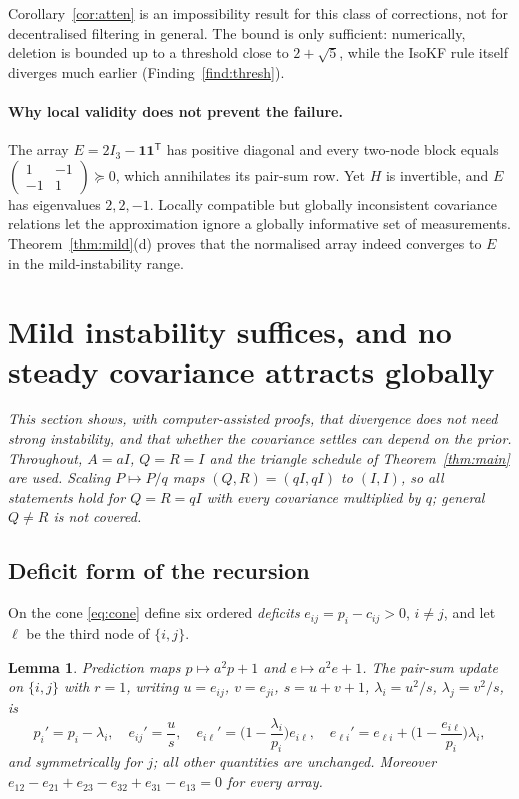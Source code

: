 \documentclass[11pt,a4paper]{article}
\numberwithin{equation}{section}
\newtheorem{lemma}[theorem]{Lemma}
\theoremstyle{remark}\newtheorem{remark}[theorem]{Remark}
\newcommand{\T}{^{\mathsf T}}
\newcommand{\one}{\mathbf 1}
\begin{document}
Corollary~\ref{cor:atten} is an impossibility result for this class of corrections, not for
decentralised filtering in general. The bound is only sufficient: numerically, deletion is
bounded up to a threshold close to $2+\sqrt5$, while the IsoKF rule itself diverges much earlier
(Finding~\ref{find:thresh}).

\paragraph{Why local validity does not prevent the failure.} The array $E=2I_3-\one\one\T$ has
positive diagonal and every two-node block equals
$\left(\begin{smallmatrix}1&-1\\-1&1\end{smallmatrix}\right)\succeq0$, which annihilates its
pair-sum row. Yet $H$ is invertible, and $E$ has eigenvalues $2,2,-1$. Locally compatible but
globally inconsistent covariance relations let the approximation ignore a globally
informative set of measurements. Theorem~\ref{thm:mild}(d) proves that the normalised array
indeed converges to $E$ in the mild-instability range.

\section{Mild instability suffices, and no steady covariance attracts globally}\label{sec:mild}

\emph{This section shows, with computer-assisted proofs, that divergence does not need strong
instability, and that whether the covariance settles can depend on the prior. Throughout,
$A=aI$, $Q=R=I$ and the triangle schedule of Theorem~\ref{thm:main} are used. Scaling
$P\mapsto P/q$ maps $(Q,R)=(qI,qI)$ to $(I,I)$, so all statements hold for $Q=R=qI$ with every
covariance multiplied by $q$; general $Q\ne R$ is not covered.}

\subsection{Deficit form of the recursion}
On the cone \eqref{eq:cone} define six ordered \emph{deficits} $e_{ij}=p_i-c_{ij}>0$, $i\ne j$,
and let $\ell$ be the third node of $\{i,j\}$.

\begin{lemma}\label{lem:deficit}
Prediction maps $p\mapsto a^2p+1$ and $e\mapsto a^2e+1$. The pair-sum update on $\{i,j\}$ with
$r=1$, writing $u=e_{ij}$, $v=e_{ji}$, $s=u+v+1$, $\lambda_i=u^2/s$, $\lambda_j=v^2/s$, is
\begin{equation}\label{eq:deficit}
p_i'=p_i-\lambda_i,\quad e_{ij}'=\frac us,\quad
e_{i\ell}'=\Big(1-\frac{\lambda_i}{p_i}\Big)e_{i\ell},\quad
e_{\ell i}'=e_{\ell i}+\Big(1-\frac{e_{i\ell}}{p_i}\Big)\lambda_i,
\end{equation}
and symmetrically for $j$; all other quantities are unchanged. Moreover
$e_{12}-e_{21}+e_{23}-e_{32}+e_{31}-e_{13}=0$ for every array.
\end{lemma}
\end{document}
